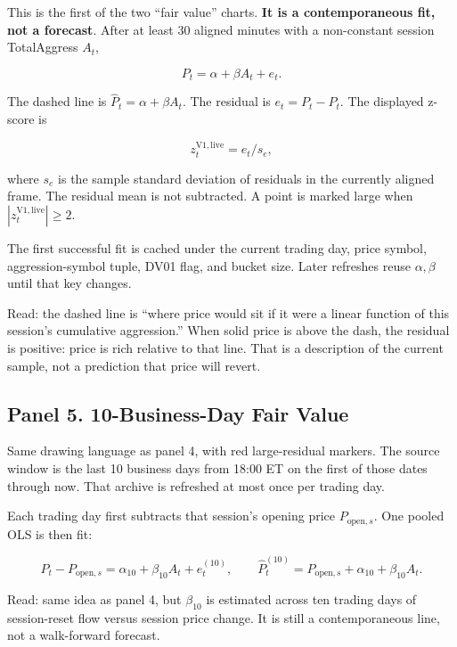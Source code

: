 \documentclass[11pt]{article}
\begin{document}
This is the first of the two ``fair value'' charts.  \textbf{It is a
contemporaneous fit, not a forecast}.  After at least 30 aligned minutes
with a non-constant session TotalAggress \(A_t\),

\begin{equation}
P_t=\alpha+\beta A_t+e_t.
\end{equation}

The dashed line is \(\widehat{P}_t=\alpha+\beta A_t\).
The residual is \(e_t=P_t-\widehat{P}_t\).  The displayed z-score is

\begin{equation}
z_t^{\mathrm{V1,live}}=e_t/s_e,
\end{equation}

where \(s_e\) is the sample standard deviation of residuals in the
currently aligned frame.  The residual mean is not subtracted.
A point is marked large when \(|z_t^{\mathrm{V1,live}}|\ge 2\).

The first successful fit is cached under the current trading day,
price symbol, aggression-symbol tuple, DV01 flag, and bucket size.
Later refreshes reuse \(\alpha,\beta\) until that key changes.

Read: the dashed line is ``where price would sit if it were a linear
function of this session's cumulative aggression.''  When solid price is
above the dash, the residual is positive: price is rich relative to that
line.  That is a description of the current sample, not a prediction
that price will revert.

\subsection{Panel 5. 10-Business-Day Fair Value}

Same drawing language as panel 4, with red large-residual markers.
The source window is the last 10 business days from 18:00 ET on
the first of those dates through now.  That archive is refreshed at most
once per trading day.

Each trading day first subtracts that session's opening price
\(P_{\mathrm{open},s}\).  One pooled OLS is then fit:

\begin{equation}
P_t-P_{\mathrm{open},s}
=
\alpha_{10}+\beta_{10}A_t+e_t^{(10)},
\qquad
\widehat{P}^{(10)}_t
=
P_{\mathrm{open},s}+\alpha_{10}+\beta_{10}A_t.
\end{equation}

Read: same idea as panel 4, but \(\beta_{10}\) is estimated across ten
trading days of session-reset flow versus session price change.  It
is still a contemporaneous line, not a walk-forward forecast.
\end{document}
